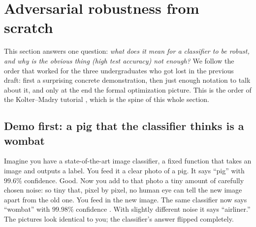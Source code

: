%
%

\section{Adversarial robustness from scratch}
\label{sec:adv-from-scratch}

This section answers one question: \emph{what does it mean for a classifier to be robust, and why is the obvious thing (high test accuracy) not enough?} We follow the order that worked for the three undergraduates who got lost in the previous draft: first a surprising concrete demonstration, then just enough notation to talk about it, and only at the end the formal optimization picture. This is the order of the Kolter--Madry tutorial \citep{kolter2018adversarial}, which is the spine of this whole section.

\subsection{Demo first: a pig that the classifier thinks is a wombat}
\label{sub:demo}

Imagine you have a state-of-the-art image classifier, a fixed function that takes an image and outputs a label. You feed it a clear photo of a pig. It says ``pig'' with $99.6\%$ confidence. Good. Now you add to that photo a tiny amount of carefully chosen noise: so tiny that, pixel by pixel, no human eye can tell the new image apart from the old one. You feed in the new image. The same classifier now says ``wombat'' with $99.98\%$ confidence \citep{kolter2018adversarial}. With slightly different noise it says ``airliner.'' The pictures look identical to you; the classifier's answer flipped completely.

